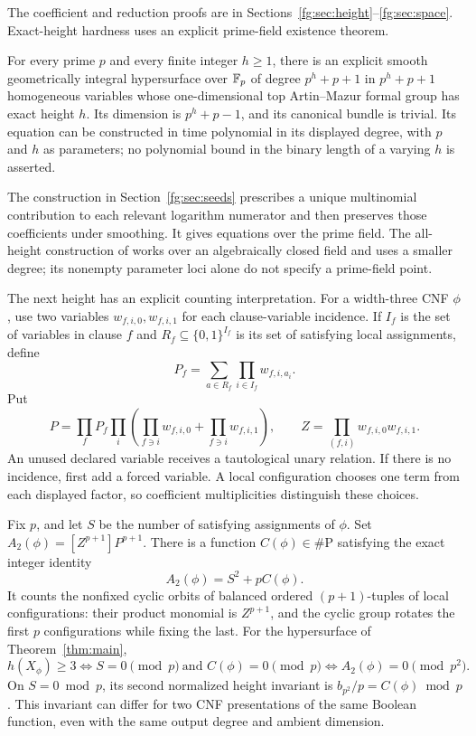The coefficient and reduction proofs are in
Sections~\ref{fg:sec:height}--\ref{fg:sec:space}.
Exact-height hardness uses an explicit prime-field existence theorem.

\begin{theorem}
\label{fg:thm:seeds-intro}
For every prime $p$ and every finite integer $h\ge1$, there is an
explicit smooth geometrically integral hypersurface over $\mathbb F_p$ of
degree $p^h+p+1$ in $p^h+p+1$ homogeneous variables whose
one-dimensional top Artin--Mazur formal group has exact height $h$.
Its dimension is $p^h+p-1$, and its canonical bundle is trivial.
Its equation can be constructed in time polynomial in its displayed
degree, with $p$ and $h$ as parameters; no polynomial bound in the
binary length of a varying $h$ is asserted.
\end{theorem}

The construction in Section~\ref{fg:sec:seeds} prescribes a unique
multinomial contribution to each relevant logarithm numerator and then
preserves those coefficients under smoothing. It gives equations over
the prime field. The all-height construction of
\citet[Theorem~4.18]{fg-kty-two} works over an algebraically closed
field and uses a smaller degree; its nonempty parameter loci alone
do not specify a prime-field point.

The next height has an explicit counting interpretation. For a
width-three CNF $\phi$, use two variables $w_{f,i,0},w_{f,i,1}$ for
each clause-variable incidence. If $I_f$ is the set of variables in
clause $f$ and $R_f\subseteq\{0,1\}^{I_f}$ is its set of satisfying
local assignments, define
\[
 P_f=\sum_{a\in R_f}\prod_{i\in I_f}w_{f,i,a_i}.
\]
Put
\[
 P=\prod_fP_f\prod_i
       \left(\prod_{f\ni i}w_{f,i,0}+\prod_{f\ni i}w_{f,i,1}\right),
 \qquad Z=\prod_{(f,i)}w_{f,i,0}w_{f,i,1}.
\]
An unused declared variable receives a tautological unary relation.
If there is no incidence, first add a forced variable. A local
configuration chooses one term from each displayed factor, so
coefficient multiplicities distinguish these choices.

\begin{theorem}\label{fg:thm:orbit-intro}
Fix $p$, and let $S$ be the number of satisfying assignments of $\phi$.
Set $A_2(\phi)=[Z^{p+1}]P^{p+1}$. There is a function
$C(\phi)\in\#\mathrm P$ satisfying the exact integer identity
\[
 A_2(\phi)=S^2+pC(\phi).
\]
It counts the nonfixed cyclic orbits of balanced ordered $(p+1)$-tuples
of local configurations: their product monomial is $Z^{p+1}$, and the
cyclic group rotates the first $p$ configurations while fixing the last.
For the hypersurface of Theorem~\ref{thm:main},
\[
 h(X_\phi)\ge3
 \iff S=0\pmod p\ \text{and }C(\phi)=0\pmod p
 \iff A_2(\phi)=0\pmod{p^2}.
\]
On $S=0\bmod p$, its second normalized height invariant is
$b_{p^2}/p=C(\phi)\bmod p$. This invariant can differ for two CNF
presentations of the same Boolean function, even with the same output
degree and ambient dimension.
\end{theorem}

